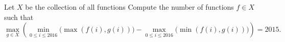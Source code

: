 Let $X$ be the collection of all functions 
Compute the number of functions $f \in X$ such that
\[ 
	\max_{g \in X}
	\left( \min_{0 \le i \le 2016} \big( \max (f(i), g(i)) \big) - \max_{0 \le i \le 2016} \big( \min (f(i),g(i)) \big) \right)
	= 2015.
\]
